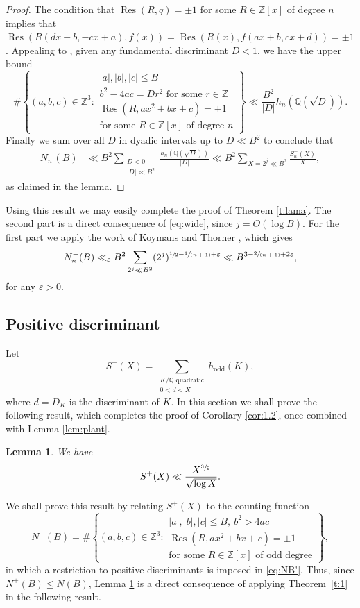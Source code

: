 \documentclass[11pt]{article}
\newcommand{\spfrac}[2]{\sfrac{#1}{(#2)}}
\DeclareMathOperator{\Res}{Res}
\newcommand{\QQ}{\mathbb{Q}}\let\Q\QQ
\newcommand{\ZZ}{\mathbb{Z}}\let\Z\ZZ
\let\ve\varepsilon
\newtheorem{lemma}[theorem]{Lemma}
\numberwithin{equation}{section}
\begin{document}
\begin{proof}
The condition that $\Res(R,q)=\pm 1$ for some $R\in\Z[x]$ of degree $n$ implies that
$\Res(R(dx-b,-cx+a),f(x))=\Res(R(x),f(ax+b,cx+d))=\pm 1$.
Appealing to \cite[Th.\,1.1]{aaron}, given any fundamental discriminant $D<1$, we have the upper bound
\[
\#\left\{(a,b,c)\in \ZZ^3:
\begin{array}{l}
|a|,|b|,|c|\leq B\\
b^2-4ac=Dr^2\text{ for some }r\in\Z\\
\Res(R,ax^2+bx+c)=\pm 1\\
\text{for some $R\in \ZZ[x]$ of degree $n$}
\end{array}
\right\}
\ll \frac{B^{2}}{|D|}h_n(\Q(\sqrt{D})).
\]
Finally we sum over all $D$ in dyadic intervals up to $D\ll B^2$
to conclude that
\begin{align*}
N_n^-(B)
&\ll B^2 \sum_{\substack{D<0\\ |D|\ll B^2}} \frac{h_n(\Q(\sqrt{D}))}{|D|}
\ll B^2 \sum_{X=2^j \ll B^2} \frac{S_n^-(X)}{X},
\end{align*}
as claimed in the lemma.
\end{proof}

Using this result we may easily complete the proof of
Theorem \ref{t:lama}. The second part is a direct consequence of \eqref{eq:wide}, since
$j=O(\log B)$. For the first part we apply the work
of Koymans and Thorner
\cite{koy}, which gives
\[
N_n^-(B)\ll_\ve
B^2 \sum_{2^j \ll B^2}
(2^j)^{\sfrac{1}{2}-\spfrac{1}{n+1}+\ve}\ll B^{3-\spfrac{2}{n+1}+2\ve},
\]
for any $\ve>0$.

\subsection{Positive discriminant}\label{sec:disc2}

Let
\[
S^+(X)=
\sum_{
\substack{K/\QQ \text{ quadratic}\\
0<d<X
}} h_\text{odd}(K),
\]
where $d=D_K$ is the discriminant of $K$.
In this section we shall prove the following result, which completes the proof of Corollary \ref{cor:1.2}, once combined with Lemma \ref{lem:plant}.

\begin{lemma}\label{lem:fish}
We have
\[
S^+(X)\ll \frac{X^{\sfrac{3}{2}}}{\sqrt{\log X}}.
\]
\end{lemma}

We shall prove this result by relating $S^+(X)$ to the counting function
\[
N^+(B)=\#\left\{(a,b,c)\in \ZZ^3:
\begin{array}{l}
|a|,|b|,|c|\leq B, ~b^2>4ac\\
\Res(R,ax^2+bx+c)=\pm 1\\
\text{for some $R\in \ZZ[x]$ of odd degree}
\end{array}
\right\}\!,
\]
in which a restriction to positive discriminants is imposed in
\eqref{eq:NB'}. Thus, since $N^+(B)\leq N(B)$,
Lemma \ref{lem:fish} is a direct consequence of
applying Theorem~\ref{t:1} in
the following result.
\end{document}
